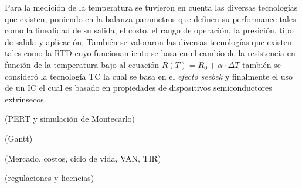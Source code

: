 



Para la medición de la temperatura se tuvieron en cuenta las diversas tecnologías que existen, poniendo en la balanza parametros que definen su performance tales como la linealidad de su salida, el costo, el rango de operación, la presición, tipo de salida y aplicación.
También se valoraron las diversas tecnologías que existen tales como la RTD cuyo funcionamiento se basa en el cambio de la resistencia en función de la temperatura bajo al ecuación $R(T)=R_0 + \alpha \cdot \Delta T$ también se consideró la tecnología TC la cual se basa en el \textit{efecto seebek} y finalmente el uso de un IC el cual es basado en propiedades de dispositivos semiconductores extrínsecos.


(PERT y simulación de Montecarlo)

(Gantt)

(Mercado, costos, ciclo de vida, VAN, TIR)

(regulaciones y licencias)


